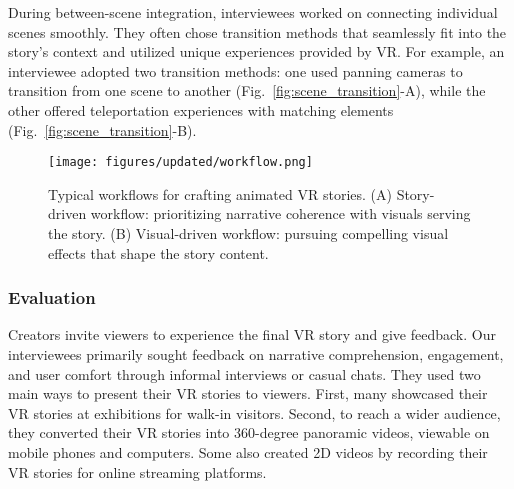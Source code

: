During between-scene integration, interviewees worked on connecting individual scenes smoothly. They often chose transition methods that seamlessly fit into the story's context and utilized unique experiences provided by VR. For example, an interviewee adopted two transition methods: one used panning cameras to transition from one scene to another (Fig.~\ref{fig:scene_transition}-A), while the other offered teleportation experiences with matching elements (Fig.~\ref{fig:scene_transition}-B).

\begin{figure*}[!tb]
    \centering
     \texttt{[image: figures/updated/workflow.png]}
    \caption{Typical workflows for crafting animated VR stories. (A) Story-driven workflow: prioritizing narrative coherence with visuals serving the story. (B) Visual-driven workflow: pursuing compelling visual effects that shape the story content.} 
    \label{fig:diverse_workflow}
\end{figure*}


\subsubsection{Evaluation}
\label{sec:evaluation}

Creators invite viewers to experience the final VR story and give feedback. Our interviewees primarily sought feedback on narrative comprehension, engagement, and user comfort through informal interviews or casual chats. 
They used two main ways to present their VR stories to viewers. First, many showcased their VR stories at exhibitions for walk-in visitors. Second, to reach a wider audience, they converted their VR stories into 360-degree panoramic videos, viewable on mobile phones and computers. Some also created 2D videos by recording their VR stories for online streaming platforms. 

